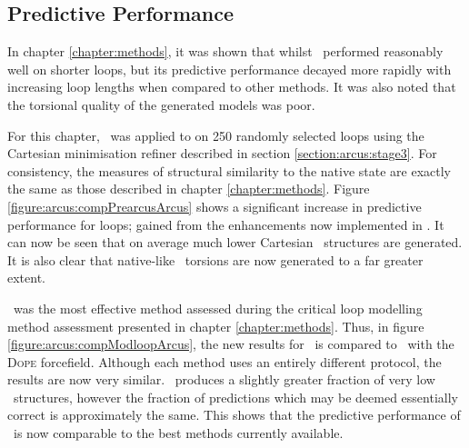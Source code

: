 \subsection{Predictive Performance}

In chapter \ref{chapter:methods}, it was shown that whilst \prearcus\ performed reasonably well on shorter  loops, but its predictive performance decayed more rapidly with increasing loop lengths when compared to other methods. It was also noted that the torsional quality of the generated models was poor.

For this chapter, \arcus\ was applied to on 250 randomly selected  loops using the Cartesian minimisation refiner described in section \ref{section:arcus:stage3}. 
For consistency, the measures of structural similarity to the native state are exactly the same as those described in chapter \ref{chapter:methods}. Figure \ref{figure:arcus:compPrearcusArcus} shows a significant increase in predictive performance for  loops; gained from the enhancements now implemented in \arcus. It can now be seen that on average much lower Cartesian \crms\ structures are generated. It is also clear that native-like \mainchain\ torsions are now generated to a far greater extent. 

\modloop\ was the most effective method assessed during the critical loop modelling method assessment presented in chapter \ref{chapter:methods}. Thus, in figure \ref{figure:arcus:compModloopArcus}, the new results for \arcus\ is compared to \modloop\ with the \textsc{Dope} forcefield.
 Although each method uses an entirely different protocol, the results are now very similar.
\modloop\ produces a slightly greater fraction of very low \crms\ structures, however the fraction of predictions which may be deemed essentially correct is approximately the same. This shows that the predictive performance of \arcus\ is now comparable to the best methods currently available.

